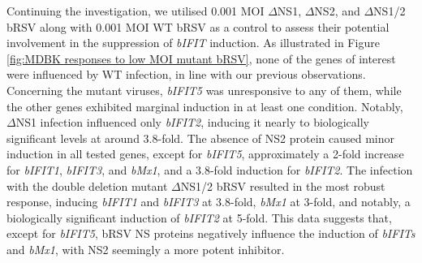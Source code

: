 Continuing the investigation, we utilised 0.001 MOI \(\Delta\)NS1, \(\Delta\)NS2, and \(\Delta\)NS1/2 bRSV along with 0.001 MOI WT bRSV as a control to assess their potential involvement in the suppression of \textit{bIFIT} induction. As illustrated in Figure \ref{fig:MDBK responses to low MOI mutant bRSV}, none of the genes of interest were influenced by WT infection, in line with our previous observations. Concerning the mutant viruses, \textit{bIFIT5} was unresponsive to any of them, while the other genes exhibited marginal induction in at least one condition. Notably, \(\Delta\)NS1 infection influenced only \textit{bIFIT2}, inducing it nearly to biologically significant levels at around 3.8-fold. The absence of NS2 protein caused minor induction in all tested genes, except for \textit{bIFIT5}, approximately a 2-fold increase for \textit{bIFIT1}, \textit{bIFIT3}, and \textit{bMx1}, and a 3.8-fold induction for \textit{bIFIT2}. The infection with the double deletion mutant \(\Delta\)NS1/2 bRSV resulted in the most robust response, inducing \textit{bIFIT1} and \textit{bIFIT3} at 3.8-fold, \textit{bMx1} at 3-fold, and notably, a biologically significant induction of \textit{bIFIT2} at 5-fold. This data suggests that, except for \textit{bIFIT5}, bRSV NS proteins negatively influence the induction of \textit{bIFITs} and \textit{bMx1}, with NS2 seemingly a more potent inhibitor.

